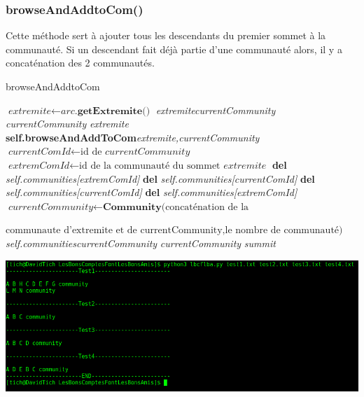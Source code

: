 \documentclass[a4paper]{article}
\begin{document}
\subsubsection{browseAndAddtoCom()}
Cette méthode sert à ajouter tous les descendants du premier sommet à la communauté. Si un descendant fait déjà partie d'une communauté alors, il y a concaténation des 2 communautés. 
\begin{algorithm}[H]
\caption{browseAndAddtoCom}\label{browse}
\begin{algorithmic}[1]
\State $\textit{extremite}\gets \textit{arc}\textbf{.getExtremite()}$
\State {}\textit{extremite}\textit{currentCommunity}
\State {} \textit{currentCommunity} \textit{extremite}
\State \textbf{self.browseAndAddToCom}\text{(}\textit{extremite,currentCommunity}\text{)}
\EndIf
{}
\State $\textit{currentComId}\gets \text{id de }\textit{currentCommunity} $
\State $\textit{extremComId}\gets \text{id de la communauté du sommet }\textit{extremite} $
\State \textbf{del }\textit{self.communities[extremComId]}
\State \textbf{del }\textit{self.communities[currentComId]}
\Else
\State \textbf{del }\textit{self.communities[currentComId]}
\State \textbf{del }\textit{self.communities[extremComId]}
\EndIf
\State $\textit{currentCommunity}\gets \textbf{Community}\text{(concaténation de la }$

$\text{communaute d'extremite et de currentCommunity,le nombre de communauté)}$
\State \textit{self.communities}\textit{currentCommunity}\text{)}
\State {} \textit{currentCommunity} \textit{summit}
\EndFor
\EndIf
\EndFor
\EndProcedure
\end{algorithmic}
\end{algorithm}
\includegraphics[scale=0.4]{comm.png}\\
\end{document}
